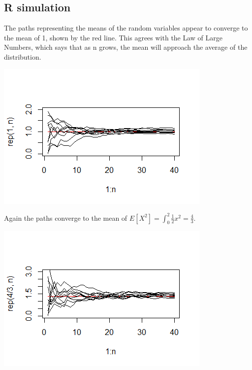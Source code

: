 \documentclass{article}
\begin{document}
\subsection*{R simulation}
The paths representing the means of the random variables 
appear to converge to the mean of 1, shown by the red line.
This agrees with the Law of Large Numbers, which says that
as n grows, the mean will approach the average of the distribution.

\includegraphics{hw1part1.png} 

Again the paths converge to the mean of  
$E[X^2] = \int_0^2 \frac{1}{2}x^2 = \frac{4}{3}$.

\includegraphics{hw1part2.png}
\end{document}
